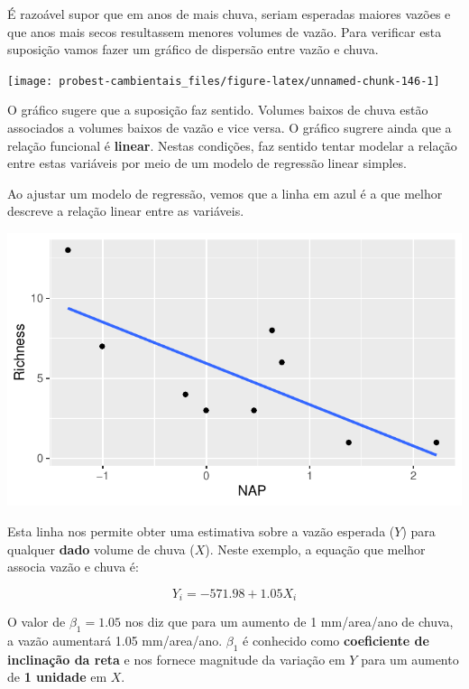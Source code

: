 \documentclass[
]{book}
\begin{document}
É razoável supor que em anos de mais chuva, seriam esperadas maiores vazões e que anos mais secos resultassem menores volumes de vazão. Para verificar esta suposição vamos fazer um gráfico de dispersão entre vazão e chuva.

\begin{center}\texttt{[image: probest-cambientais\_files/figure-latex/unnamed-chunk-146-1]} \end{center}

O gráfico sugere que a suposição faz sentido. Volumes baixos de chuva estão associados a volumes baixos de vazão e vice versa. O gráfico sugrere ainda que a relação funcional é \textbf{linear}. Nestas condições, faz sentido tentar modelar a relação entre estas variáveis por meio de um modelo de regressão linear simples.

Ao ajustar um modelo de regressão, vemos que a linha em azul é a que melhor descreve a relação linear entre as variáveis.

\begin{center}\includegraphics{probest-cambientais_files/figure-latex/unnamed-chunk-147-1} \end{center}

Esta linha nos permite obter uma estimativa sobre a vazão esperada (\(Y\)) para qualquer \textbf{dado} volume de chuva (\(X\)). Neste exemplo, a equação que melhor associa vazão e chuva é:

\[Y_i = -571.98 + 1.05 X_i\]

O valor de \(\beta_1 = 1.05\) nos diz que para um aumento de 1 mm/area/ano de chuva, a vazão aumentará 1.05 mm/area/ano. \(\beta_1\) é conhecido como \textbf{coeficiente de inclinação da reta} e nos fornece magnitude da variação em \(Y\) para um aumento de \textbf{1 unidade} em \(X\).
\end{document}
